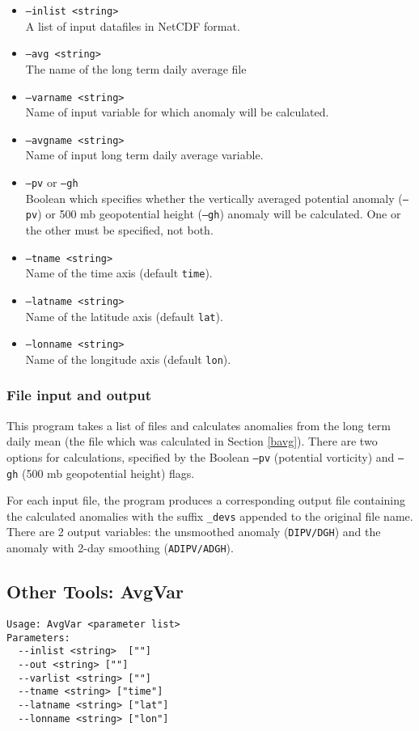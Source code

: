 \documentclass{article}
\begin{document}
\begin{itemize}
\item[]\texttt{--inlist <string>} \\ A list of input datafiles in NetCDF format. 
\item[] \texttt{--avg <string>}\\ The name of the long term daily average file 
\item[] \texttt{--varname <string>}\\Name of input variable for which anomaly will be calculated.
\item[]\texttt{--avgname <string>}\\Name of input long term daily average variable.
\item[]\texttt{--pv} or \texttt{--gh}\\Boolean which specifies whether the vertically averaged potential anomaly (\texttt{--pv}) or 500 mb geopotential height (\texttt{--gh}) anomaly will be calculated. One or the other must be specified, not both.
\item[] \texttt{--tname <string>}\\Name of the time axis (default \texttt{time}).
\item[]\texttt{--latname <string>}\\Name of the latitude axis (default \texttt{lat}).
\item[]\texttt{--lonname <string>}\\Name of the longitude axis (default \texttt{lon}).
\end{itemize}

\subsubsection{File input and output}
This program takes a list of files and calculates anomalies from the long term daily mean (the file which was calculated in Section \ref{bavg}). There are two options for calculations, specified by the Boolean \texttt{--pv} (potential vorticity) and \texttt{--gh} (500 mb geopotential height) flags. 

For each input file, the program produces a corresponding output file containing the calculated anomalies with the suffix \texttt{\_devs} appended to the original file name. There are 2 output variables: the unsmoothed anomaly (\texttt{DIPV/DGH}) and  the anomaly with 2-day smoothing (\texttt{ADIPV/ADGH}).


\subsection{Other Tools: AvgVar}
\begin{verbatim}
Usage: AvgVar <parameter list>
Parameters:
  --inlist <string>  [""]
  --out <string> [""]
  --varlist <string> [""]
  --tname <string> ["time"]
  --latname <string> ["lat"]
  --lonname <string> ["lon"]
\end{verbatim}
\end{document}
